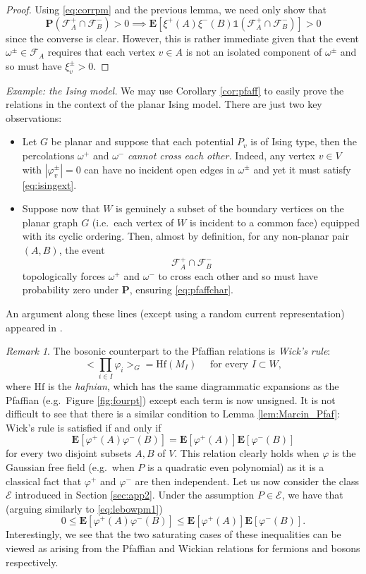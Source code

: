 \documentclass{article}
\numberwithin{equation}{section}
\theoremstyle{definition}
\theoremstyle{definition}
\theoremstyle{remark}
\newtheorem{remark}{Remark}
\newcommand{\E}{\mathbb{E}}
\newcommand\vp{\varphi}
\newcommand\Ec{\mathcal{E}}
\newcommand{\w}{\omega}
\newcommand{\vpp}{\vp^+}
\newcommand{\vpm}{\vp^-}
\renewcommand{\P}{\mathrm{\mathbf{P}}}
\renewcommand{\E}{\mathrm{\mathbf{E}}}
\renewcommand{\L}{\xi}
\renewcommand{\i}{\mathds{1}}
\newcommand{\F}{\mathcal{F}}
\begin{document}
\begin{proof}
	Using \eqref{eq:corrpm} and the previous lemma, we need only show that 
	\[
		\P \left( \F_A^+ \cap \F_{B}^- \right) > 0 \implies \E\left[ \L^+(A) \L^-(B) \i\left( \F^+_A \cap \F^-_B \right)  \right] > 0
	\] 
	since the converse is clear.	However, this is rather immediate given that the event $\w^\pm \in \F_A$ requires that each vertex $v \in A$ is not an isolated component of $\w^\pm$ and so must have $\L^\pm_v > 0$. 
\end{proof}
\noindent\emph{Example: the Ising model. }We may use Corollary \ref{cor:pfaff} to easily prove the relations in the context of the planar Ising model. There are just two key observations:
\begin{itemize}
	\item 
Let $G$ be planar and suppose that each potential $P_v$ is of Ising type, then the percolations $\w^+$ and $\w^-$ \emph{cannot cross each other.} Indeed, any vertex $v \in V$ with $ |\vp^\pm_v| = 0$ can have no incident open edges in $\w^\pm$ and yet it must satisfy \eqref{eq:isingext}.
	\item 
Suppose now that $W$ is genuinely a subset of the boundary vertices on the planar graph $G$ (i.e.~each vertex of $W$ is incident to a common face) equipped with its cyclic ordering. Then, almost by definition, for any non-planar pair $(A,B)$, the event 
\[
	\F^+_A \cap \F^-_{B}
\] 
topologically forces $\w^+$ and $\w^-$ to cross each other and so must have probability zero under $\P$, ensuring \eqref{eq:pfaffchar}. 
\end{itemize}
An argument along these lines (except using a random current representation) appeared in \cite{Lis22a}.
\begin{remark}\label{remark:wickandpfaff}
	The bosonic counterpart to the Pfaffian relations is \emph{Wick's rule}:
	\[
		\Big< \prod_{i \in I} \vp_i \Big>_{G} = \textrm{Hf}(M_I) \quad \text{ for every $I \subset W$},
	\] 
	where $\textrm{Hf}$ is the \emph{hafnian}, which has the same diagrammatic expansions as the Pfaffian (e.g.~Figure \ref{fig:fourpt}) except each term is now unsigned. 
	It is not difficult to see that there is a similar condition to Lemma \ref{lem:Marcin_Pfaf}: Wick's rule is satisfied if and only if
	\[
		\E [ \vp^+(A) \vp^-({B}) ]  = \E [ \vp^+(A) ] \E[ \vp^-(B) ] 
	\] 
	for every two disjoint subsets $A,B$ of $V$. This relation clearly holds when $\vp$ is the Gaussian free field (e.g.~when $P$ is a quadratic even polynomial) as it is a classical fact that $\vpp$ and $\vpm$ are then independent. 
	Let us now consider the class $\Ec$ introduced in Section \ref{sec:app2}. Under the assumption $P \in \Ec$, we have that (arguing similarly to \eqref{eq:lebowpm1})
	\[
		0 \leq \E [ \vp^+(A) \vp^-({B}) ] \leq \E[ \vp^+(A) ] \E[ \vp^-({B}) ].
	\] 
	Interestingly, we see that the two saturating cases of these inequalities can be viewed as arising from the Pfaffian and Wickian relations for fermions and bosons respectively. 
\end{remark}
\end{document}
